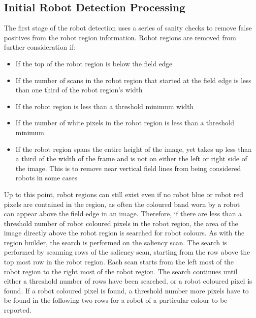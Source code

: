 \documentclass[pdftex,11pt,a4paper]{report}
\begin{document}
\subsection{Initial Robot Detection Processing}
The first stage of the robot detection uses a series of sanity checks to remove false positives from the robot region information. Robot regions are removed from further consideration if: \begin{itemize}
\item{If the top of the robot region is below the field edge}
\item{If the number of scans in the robot region that started at the field edge is less than one third of the robot region's width}
\item{If the robot region is less than a threshold  minimum width}
\item{If the number of white pixels in the robot region is less than a threshold minimum}
\item{If the robot region spans the entire height of the image, yet takes up less than a third of the width of the frame and is not on either the left or right side of the image. This is to remove near vertical field lines from being considered robots in some cases}
\end{itemize}
Up to this point, robot regions can still exist even if no robot blue or robot red pixels are contained in the region, as often the coloured band worn by a robot can appear above the field edge in an image. Therefore, if there are less than a threshold number of robot coloured pixels in the robot region, the area of the image directly above the robot region is searched for robot colours. As with the region builder, the search is performed on the saliency scan. The search is performed by scanning rows of the saliency scan, starting from the row above the top most row in the robot region. Each scan starts from the left most of the robot region to the right most of the robot region. The search continues until either a threshold number of rows have been searched, or a robot coloured pixel is found. If a robot coloured pixel is found, a threshold number more pixels have to be found in the following two rows for a robot of a particular colour to be reported.
\end{document}
